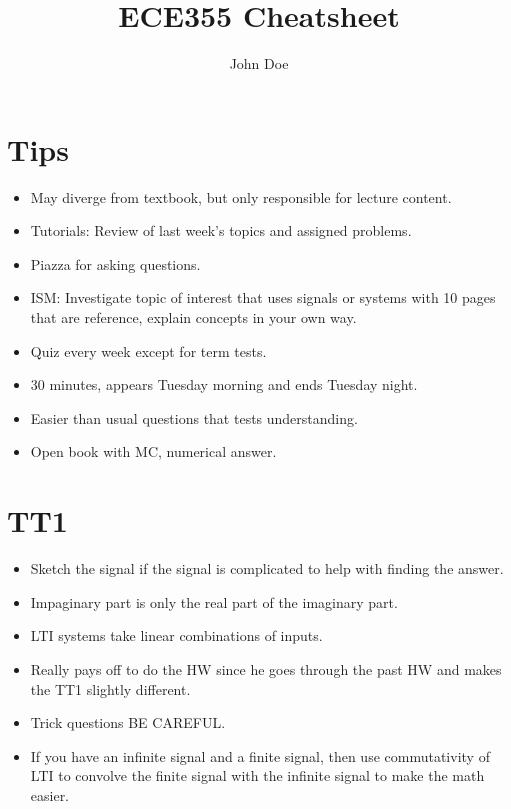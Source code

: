 \documentclass{article}
\title{ECE355 Cheatsheet}
\author{John Doe}
\begin{document}
\maketitle

\tableofcontents

\listoffigures

\listoftables

\section*{Tips}
\begin{intuition}
    \begin{itemize}
        \item May diverge from textbook, but only responsible for lecture content.
        \item Tutorials: Review of last week's topics and assigned problems. 
        \item Piazza for asking questions.
        \item ISM: Investigate topic of interest that uses signals or systems with 10 pages that are reference, explain concepts in your own way.
        \item Quiz every week except for term tests. 
        \item 30 minutes, appears Tuesday morning and ends Tuesday night. 
        \item Easier than usual questions that tests understanding. 
        \item Open book with MC, numerical answer. 
    \end{itemize}
\end{intuition}

\section*{TT1}
\begin{intuition}
    \begin{itemize}
        \item Sketch the signal if the signal is complicated to help with finding the answer. 
        \item Impaginary part is only the real part of the imaginary part. 
        \item LTI systems take linear combinations of inputs. 
        \item Really pays off to do the HW since he goes through the past HW and makes the TT1 slightly different. 
        \item Trick questions BE CAREFUL. 
        \item If you have an infinite signal and a finite signal, then use commutativity of LTI to convolve the finite signal with the infinite signal to make the math easier. 
    \end{itemize}
\end{intuition}
\end{document}
